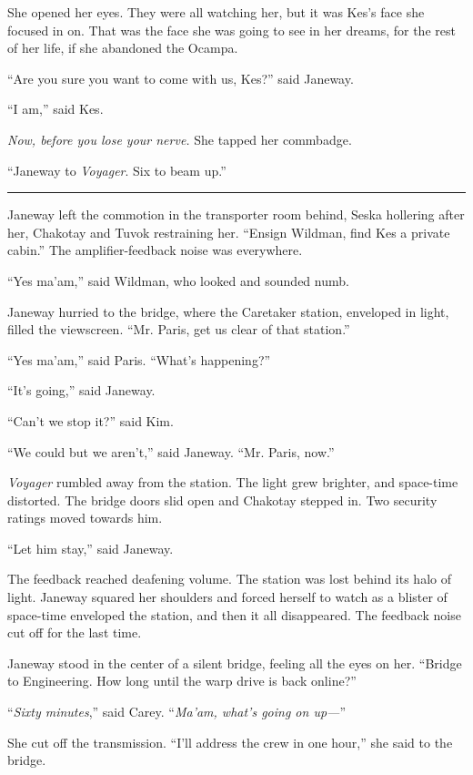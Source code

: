 \documentclass[twoside,letterpaper,12pt]{memoir}
\begin{document}
She opened her eyes. They were all watching her, but it was Kes’s face she focused in on. That was the face she was going to see in her dreams, for the rest of her life, if she abandoned the Ocampa. 

``Are you sure you want to come with us, Kes?'' said Janeway. 

``I am,'' said Kes. 

\textit{Now, before you lose your nerve. }She tapped her commbadge. 

``Janeway to \textit{Voyager}. Six to beam up.'' 

\fancybreak{\rule{3cm}{0.4 pt}} 

Janeway left the commotion in the transporter room behind, Seska hollering after her, Chakotay and Tuvok restraining her. ``Ensign Wildman, find Kes a private cabin.'' The amplifier-feedback noise was everywhere. 

``Yes ma’am,'' said Wildman, who looked and sounded numb. 

Janeway hurried to the bridge, where the Caretaker station, enveloped in light, filled the viewscreen. ``Mr. Paris, get us clear of that station.'' 

``Yes ma’am,'' said Paris. ``What’s happening?'' 

``It’s going,'' said Janeway. 

``Can’t we stop it?'' said Kim. 

``We could but we aren’t,'' said Janeway. ``Mr. Paris, now.'' 

\textit{Voyager} rumbled away from the station. The light grew brighter, and space-time distorted. The bridge doors slid open and Chakotay stepped in. Two security ratings moved towards him. 

``Let him stay,'' said Janeway. 

The feedback reached deafening volume. The station was lost behind its halo of light. Janeway squared her shoulders and forced herself to watch as a blister of space-time enveloped the station, and then it all disappeared. The feedback noise cut off for the last time. 

Janeway stood in the center of a silent bridge, feeling all the eyes on her. ``Bridge to Engineering. How long until the warp drive is back online?'' 

``\textit{Sixty minutes},'' said Carey. ``\textit{Ma’am, what’s going on up---}'' 

She cut off the transmission. ``I’ll address the crew in one hour,'' she said to the bridge. 
\end{document}
